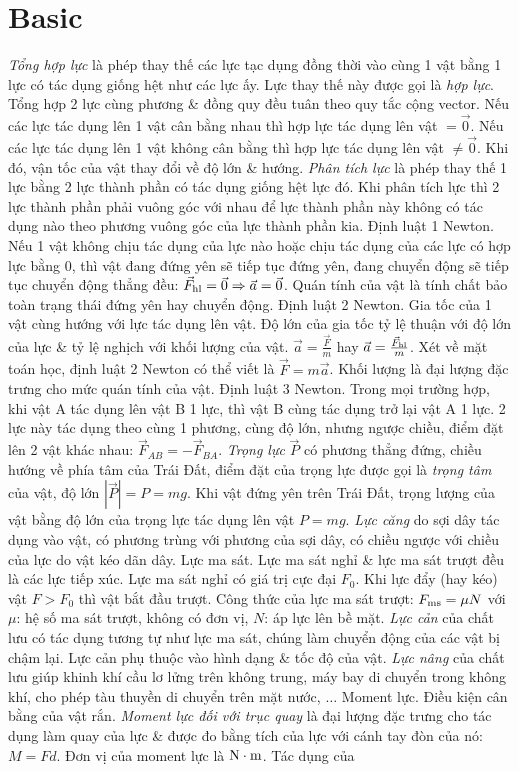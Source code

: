 \documentclass{article}
\begin{document}
\section{Basic}
 {\it Tổng hợp lực} là phép thay thế các lực tạc dụng đồng thời vào cùng 1 vật bằng 1 lực có tác dụng giống hệt như các lực ấy. Lực thay thế này được gọi là {\it hợp lực}. Tổng hợp 2 lực cùng phương \& đồng quy đều tuân theo quy tắc cộng vector. Nếu các lực tác dụng lên 1 vật cân bằng nhau thì hợp lực tác dụng lên vật $= \vec{0}$. Nếu các lực tác dụng lên 1 vật không cân bằng thì hợp lực tác dụng lên vật $\ne\vec{0}$. Khi đó, vận tốc của vật thay đổi về độ lớn \& hướng.  {\it Phân tích lực} là phép thay thế 1 lực bằng 2 lực thành phần có tác dụng giống hệt lực đó. Khi phân tích lực thì 2 lực thành phần phải vuông góc với nhau để lực thành phần này không có tác dụng nào theo phương vuông góc của lực thành phần kia.  {\sf Định luật 1 Newton.} Nếu 1 vật không chịu tác dụng của lực nào hoặc chịu tác dụng của các lực có hợp lực bằng $0$, thì vật đang đứng yên sẽ tiếp tục đứng yên, đang chuyển động sẽ tiếp tục chuyển động thẳng đều: $\vec{F}_{\rm hl} = \vec{0}\Rightarrow\vec{a} = \vec{0}$. Quán tính của vật là tính chất bảo toàn trạng thái đứng yên hay chuyển động.  {\sf Định luật 2 Newton.} Gia tốc của 1 vật cùng hướng với lực tác dụng lên vật. Độ lớn của gia tốc tỷ lệ thuận với độ lớn của lực \& tỷ lệ nghịch với khối lượng của vật. $\vec{a} = \frac{\vec{F}}{m}$ hay $\vec{a} = \frac{\vec{F}_{\rm hl}}{m}$. Xét về mặt toán học, định luật 2 Newton có thể viết là $\vec{F} = m\vec{a}$. Khối lượng là đại lượng đặc trưng cho mức quán tính của vật.  {\sf Định luật 3 Newton.} Trong mọi trường hợp, khi vật A tác dụng lên vật B 1 lực, thì vật B cùng tác dụng trở lại vật A 1 lực. 2 lực này tác dụng theo cùng 1 phương, cùng độ lớn, nhưng ngược chiều, điểm đặt lên 2 vật khác nhau: $\vec{F}_{AB} = -\vec{F}_{BA}$.  {\it Trọng lực} $\vec{P}$ có phương thẳng đứng, chiều hướng về phía tâm của Trái Đất, điểm đặt của trọng lực được gọi là {\it trọng tâm} của vật, độ lớn $|\vec{P}| = P = mg$. Khi vật đứng yên trên Trái Đất, trọng lượng của vật bằng độ lớn của trọng lực tác dụng lên vật $P = mg$.  {\it Lực căng} do sợi dây tác dụng vào vật, có phương trùng với phương của sợi dây, có chiều ngược với chiều của lực do vật kéo dãn dây.  {\sf Lực ma sát.} Lực ma sát nghỉ \& lực ma sát trượt đều là các lực tiếp xúc. Lực ma sát nghỉ có giá trị cực đại $F_0$. Khi lực đẩy (hay kéo) vật $F > F_0$ thì vật bắt đầu trượt. Công thức của lực ma sát trượt: $F_{\rm ms} = \mu N$ với $\mu$: hệ số ma sát trượt, không có đơn vị, $N$: áp lực lên bề mặt.  {\it Lực cản} của chất lưu có tác dụng tương tự như lực ma sát, chúng làm chuyển động của các vật bị chậm lại. Lực cản phụ thuộc vào hình dạng \& tốc độ của vật. {\it Lực nâng} của chất lưu giúp khinh khí cầu lơ lửng trên không trung, máy bay di chuyển trong không khí, cho phép tàu thuyền di chuyển trên mặt nước, $\ldots$  {\sf Moment lực. Điều kiện cân bằng của vật rắn.} {\it Moment lực đối với trục quay} là đại lượng đặc trưng cho tác dụng làm quay của lực \& được đo bằng tích của lực với cánh tay đòn của nó: $M = Fd$. Đơn vị của moment lực là $\rm N\cdot m$. Tác dụng của 
\end{document}
